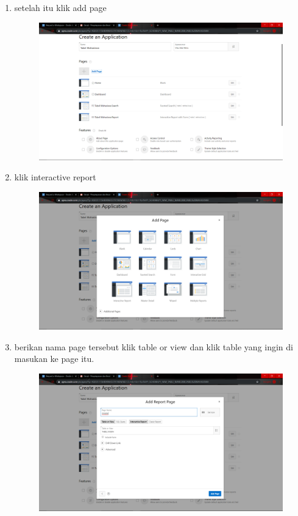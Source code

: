 \begin{enumerate}
\item setelah itu klik add page 
\begin{figure}[H]
    \centering
    \includegraphics[scale=0.1]{figures/20}
    \caption{}
    \label{CLI}
\end{figure}


\item klik interactive report
\begin{figure}[H]
    \centering
    \includegraphics[scale=0.1]{figures/21}
    \caption{}
    \label{Anaconda Navigator}
\end{figure}

\item berikan nama page tersebut klik table or view dan klik table yang ingin di masukan ke page itu.
\begin{figure}[H]
    \centering
    \includegraphics[scale=0.1]{figures/22}
    \caption{}
    \label{Print Hello World}
\end{figure}


\end{enumerate}

